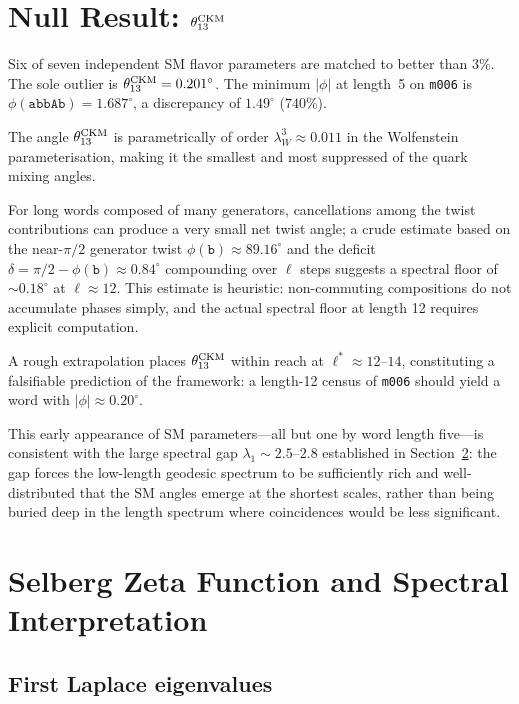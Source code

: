 \documentclass[11pt,a4paper]{article}
\newcommand{\mfld}[1]{\texttt{#1}}
\newcommand{\word}[1]{\texttt{#1}}
\newcommand{\degr}{^{\circ}}
\begin{document}
\section{Null Result: \texorpdfstring{$\theta_{13}^{\rm CKM}$}{theta13(CKM)}}
\label{sec:null}

Six of seven independent SM flavor parameters are matched to better than $3\%$.
The sole outlier is $\theta_{13}^{\rm CKM}=0.201\degr$.
The minimum $|\phi|$ at length~5 on \mfld{m006} is
$\phi(\word{abbAb})=1.687\degr$, a discrepancy of $1.49\degr$ ($740\%$).

The angle $\theta_{13}^{\rm CKM}$ is parametrically of order
$\lambda_W^3\approx 0.011$ in the Wolfenstein parameterisation,
making it the smallest and most suppressed of the quark mixing angles.

For long words composed of many generators, cancellations among the
twist contributions can produce a very small net twist angle; a
crude estimate based on the near-$\pi/2$ generator twist
$\phi(\word{b})\approx 89.16\degr$ and the deficit
$\delta=\pi/2-\phi(\word{b})\approx 0.84\degr$ compounding over
$\ell$ steps suggests a spectral floor of ${\sim}0.18\degr$ at
$\ell\approx 12$.
This estimate is heuristic: non-commuting compositions do not accumulate
phases simply, and the actual spectral floor at length 12 requires
explicit computation.

A rough extrapolation places $\theta_{13}^{\rm CKM}$ within reach at
$\ell^*\approx 12$--$14$, constituting a falsifiable prediction of the
framework: a length-12 census of \mfld{m006} should yield a word with
$|\phi|\approx 0.20\degr$.

This early appearance of SM parameters---all but one by word length
five---is consistent with the large spectral gap $\lambda_1\sim 2.5$--$2.8$
established in Section~\ref{sec:selberg}: the gap forces the low-length
geodesic spectrum to be sufficiently rich and well-distributed that the SM
angles emerge at the shortest scales, rather than being buried deep in the
length spectrum where coincidences would be less significant.

\section{Selberg Zeta Function and Spectral Interpretation}
\label{sec:selberg}

\subsection{First Laplace eigenvalues}
\end{document}

